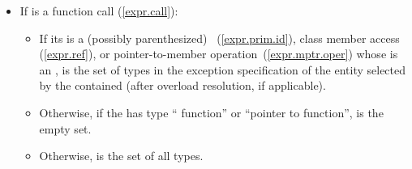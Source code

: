 \begin{itemize}
\item
If  is a function call (\ref{expr.call}):
\begin{itemize}
\item
If its  is a (possibly parenthesized)
~(\ref{expr.prim.id}), class member access
(\ref{expr.ref}), or pointer-to-member operation~(\ref{expr.mptr.oper})
whose  is an ,
 is the set of types in the exception specification
of the entity selected by the
contained  (after overload resolution, if applicable).
\item
Otherwise, if the  has type
`` function'' or
``pointer to  function'',
 is the empty set.
\item
Otherwise,  is the set of all types.
\end{itemize}


\end{itemize}
